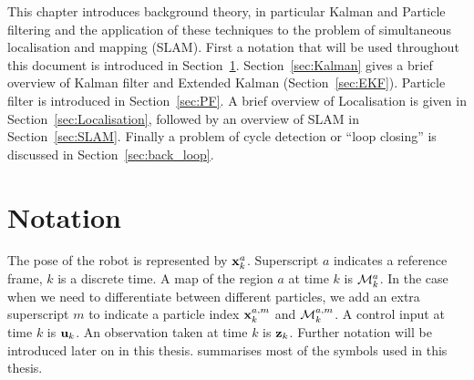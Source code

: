 This chapter introduces background theory, in particular Kalman and
Particle filtering and the application of these techniques to the
problem of simultaneous localisation and mapping (SLAM). First a
notation that will be used throughout this document is introduced in
Section~\ref{sec:Notation}. Section~\ref{sec:Kalman} gives a brief
overview of Kalman filter and Extended Kalman (Section~\ref{sec:EKF}).
Particle filter is introduced in Section~\ref{sec:PF}. A brief
overview of Localisation is given in Section~\ref{sec:Localisation},
followed by an overview of SLAM in Section~\ref{sec:SLAM}. Finally a
problem of cycle detection or ``loop closing'' is discussed in
Section~\ref{sec:back_loop}.


\section {Notation}
\label{sec:Notation}

The pose of the robot is represented by $\x{k}{}{a}$. Superscript $a$
indicates a reference frame, $k$ is a discrete time. A map of the
region $a$ at time $k$ is $\map{k}{}{a}$. In the case when we need to
differentiate between different particles, we add an extra superscript
$m$ to indicate a particle index $\x{k}{a}{m}$ and $\map{k}{a}{m}$. A
control input at time $k$ is ${\bf u}_{k}$. An observation taken at time $k$
is ${\bf z}_{k}$. Further notation will be introduced later on in this
thesis.  summarises most of the symbols used in
this thesis.




